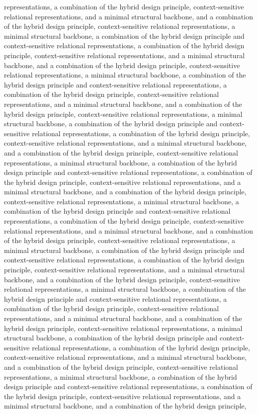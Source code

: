 representations, a combination of the hybrid design principle, context-sensitive relational representations, and a minimal structural backbone, and a combination of the hybrid design principle, context-sensitive relational representations, a minimal structural backbone, a combination of the hybrid design principle and context-sensitive relational representations, a combination of the hybrid design principle, context-sensitive relational representations, and a minimal structural backbone, and a combination of the hybrid design principle, context-sensitive relational representations, a minimal structural backbone, a combination of the hybrid design principle and context-sensitive relational representations, a combination of the hybrid design principle, context-sensitive relational representations, and a minimal structural backbone, and a combination of the hybrid design principle, context-sensitive relational representations, a minimal structural backbone, a combination of the hybrid design principle and context-sensitive relational representations, a combination of the hybrid design principle, context-sensitive relational representations, and a minimal structural backbone, and a combination of the hybrid design principle, context-sensitive relational representations, a minimal structural backbone, a combination of the hybrid design principle and context-sensitive relational representations, a combination of the hybrid design principle, context-sensitive relational representations, and a minimal structural backbone, and a combination of the hybrid design principle, context-sensitive relational representations, a minimal structural backbone, a combination of the hybrid design principle and context-sensitive relational representations, a combination of the hybrid design principle, context-sensitive relational representations, and a minimal structural backbone, and a combination of the hybrid design principle, context-sensitive relational representations, a minimal structural backbone, a combination of the hybrid design principle and context-sensitive relational representations, a combination of the hybrid design principle, context-sensitive relational representations, and a minimal structural backbone, and a combination of the hybrid design principle, context-sensitive relational representations, a minimal structural backbone, a combination of the hybrid design principle and context-sensitive relational representations, a combination of the hybrid design principle, context-sensitive relational representations, and a minimal structural backbone, and a combination of the hybrid design principle, context-sensitive relational representations, a minimal structural backbone, a combination of the hybrid design principle and context-sensitive relational representations, a combination of the hybrid design principle, context-sensitive relational representations, and a minimal structural backbone, and a combination of the hybrid design principle, context-sensitive relational representations, a minimal structural backbone, a combination of the hybrid design principle and context-sensitive relational representations, a combination of the hybrid design principle, context-sensitive relational representations, and a minimal structural backbone, and a combination of the hybrid design principle, 